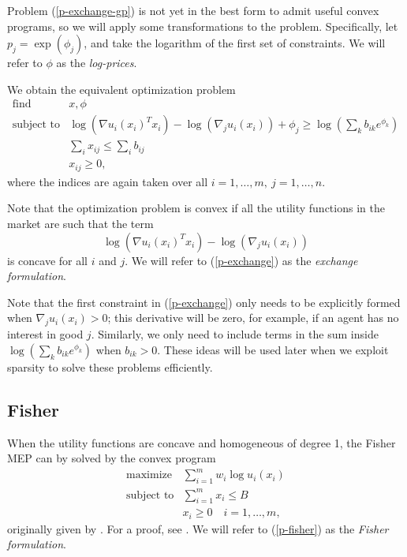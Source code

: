 \documentclass[12pt]{article}
\begin{document}
Problem (\ref{p-exchange-gp}) is not yet in the best form to admit useful
convex programs, so we will apply some transformations to the problem.
Specifically, let $p_j = \exp(\phi_j)$, and take the logarithm of the first set
of constraints. We will refer to $\phi$ as the \emph{log-prices}.

We obtain the equivalent optimization problem
\begin{equation}
\label{p-exchange}
\begin{array}{ll}
\mbox{find} & x, \phi \\
\mbox{subject to} & \log(\nabla u_i(x_i)^T x_i) - \log(\nabla_j u_i(x_i)) + \phi_j 
\geq \log(\sum_k b_{ik} e^{\phi_k})\\
& \sum_i x_{ij} \leq \sum_i b_{ij}\\
& x_{ij} \geq 0,
\end{array}
\end{equation}
where the indices are again taken over all $i=1,\ldots,m,\ j=1,\ldots,n$.

Note that the optimization problem is convex if all the utility functions
in the market are such that the term
\begin{equation}
\label{e-util-constraint}
\log(\nabla u_i(x_i)^T x_i) - \log(\nabla_j u_i(x_i))
\end{equation}
is concave for all $i$ and $j$.
We will refer to (\ref{p-exchange}) as the \emph{exchange formulation}.

Note that the first constraint in (\ref{p-exchange}) only needs to be
explicitly formed when $\nabla_j u_i(x_i) > 0$; this derivative will be zero,
for example, if an agent has no interest in good $j$. Similarly, we only need
to include terms in the sum inside $\log(\sum_k b_{ik} e^{\phi_k})$ when
$b_{ik} > 0$. These ideas will be used later when we exploit sparsity to solve
these problems efficiently.

\subsection{Fisher}
\label{sec:convex_form_fisher}

When the utility functions are concave and homogeneous of degree 1,
the Fisher MEP can by solved by the convex program
\begin{equation}
\label{p-fisher}
\begin{array}{ll}
\mbox{maximize} & \sum_{i=1}^m w_i \log u_i(x_i) \\
\mbox{subject to} & \sum_{i=1}^m x_i \leq B\\
& x_i \geq 0\quad i=1,\ldots,m,
\end{array}
\end{equation}
originally given by \cite{eisenberg1959consensus, gale1960theory,
eisenberg1961aggregation}. For a proof, see \cite[\S6.2]{nisan2007algorithmic}.
We will refer to (\ref{p-fisher}) as the \emph{Fisher formulation}.
\end{document}
